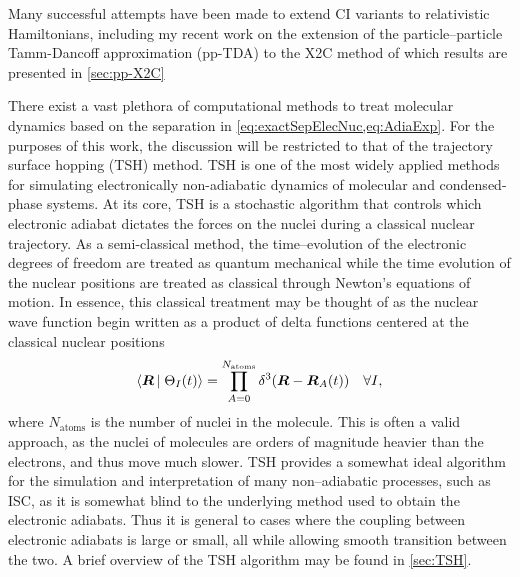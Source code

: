 Many successful attempts have been made to extend CI variants to
relativistic Hamiltonians\cite{Neese13_JCP104113, Olsen97_TCA125, 
Jensen96_JCP4083}, including my recent work on the extension of the
particle--particle Tamm-Dancoff approximation (pp-TDA) to the X2C method
\cite{DBWY16_Accepted1} of which results are presented in \cref{sec:pp-X2C}

There exist a vast plethora of computational methods to treat molecular dynamics
based on the separation in \cref{eq:exactSepElecNuc,eq:AdiaExp}. For the
purposes of this work, the discussion will be restricted to that of the
trajectory surface hopping (TSH) method.  TSH is one of the most widely applied
methods for simulating electronically non-adiabatic dynamics of molecular and
condensed-phase systems.\cite{Barbatti11_1759, Tavernelli14_62, Tully12_22A301,
Tully98_407, Hynes14_97} At its core, TSH is a stochastic algorithm that
controls which electronic adiabat dictates the forces on the nuclei during a
classical nuclear trajectory.\cite{Preston71_562} As a semi-classical method, the
time--evolution of the electronic degrees of freedom are treated as quantum
mechanical while the time evolution of the nuclear positions are treated as
classical through Newton's equations of motion. In essence, this classical
treatment may be thought of as the nuclear wave function begin written as a
product of delta functions centered at the classical nuclear positions
\begin{equation}
\left\langle \boldsymbol{R} \left\vert\right. \Theta_I (t) \right\rangle = 
  \prod_{A = 0}^{N_\mathrm{atoms}} \delta^3(\boldsymbol{R} - \boldsymbol{R}_A(t))
  \quad \forall I,
  \label{eq:ClassicalNuclei}
\end{equation}
where $N_\mathrm{atoms}$ is the number of nuclei in the molecule.  This is often
a valid approach, as the nuclei of molecules are orders of magnitude heavier
than the electrons, and thus move much slower. TSH provides a somewhat ideal
algorithm for the simulation and interpretation of many non--adiabatic
processes, such as ISC, as it is somewhat blind to the underlying method used to
obtain the electronic adiabats. Thus it is general to cases where the coupling
between electronic adiabats is large or small, all while allowing smooth
transition between the two. A brief overview of the TSH algorithm may be found
in \cref{sec:TSH}. 


